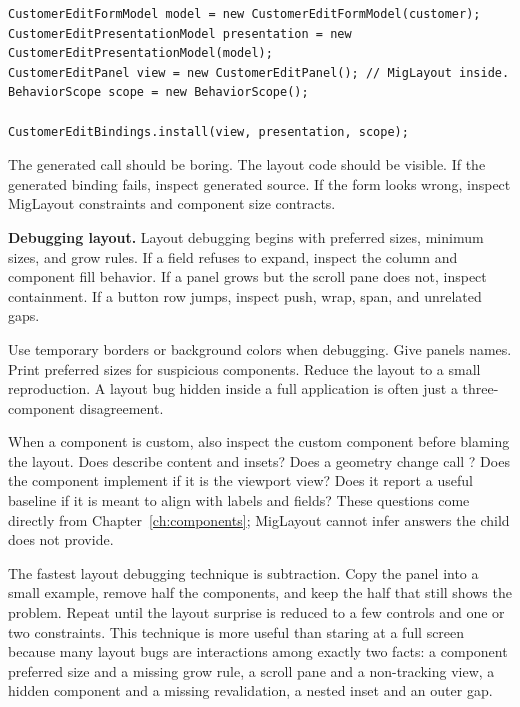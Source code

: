 \begin{lstlisting}[caption={The intended division: handwritten layout, generated binding.}]
CustomerEditFormModel model = new CustomerEditFormModel(customer);
CustomerEditPresentationModel presentation = new CustomerEditPresentationModel(model);
CustomerEditPanel view = new CustomerEditPanel(); // MigLayout inside.
BehaviorScope scope = new BehaviorScope();

CustomerEditBindings.install(view, presentation, scope);
\end{lstlisting}

The generated call should be boring. The layout code should be visible. If the generated binding fails, inspect generated source. If the form looks wrong, inspect MigLayout constraints and component size contracts.

\textbf{Debugging layout.}
Layout debugging begins with preferred sizes, minimum sizes, and grow rules. If a field refuses to expand, inspect the column and component fill behavior. If a panel grows but the scroll pane does not, inspect containment. If a button row jumps, inspect push, wrap, span, and unrelated gaps.

Use temporary borders or background colors when debugging. Give panels names. Print preferred sizes for suspicious components. Reduce the layout to a small reproduction. A layout bug hidden inside a full application is often just a three-component disagreement.

When a component is custom, also inspect the custom component before blaming
the layout. Does  describe content and insets? Does a
geometry change call ? Does the component implement
 if it is the viewport view? Does it report a useful baseline
if it is meant to align with labels and fields? These questions come directly
from Chapter~\ref{ch:components}; MigLayout cannot infer answers the child does
not provide.

The fastest layout debugging technique is subtraction. Copy the panel into a
small example, remove half the components, and keep the half that still shows
the problem. Repeat until the layout surprise is reduced to a few controls and
one or two constraints. This technique is more useful than staring at a full
screen because many layout bugs are interactions among exactly two facts: a
component preferred size and a missing grow rule, a scroll pane and a
non-tracking view, a hidden component and a missing revalidation, a nested inset
and an outer gap.


